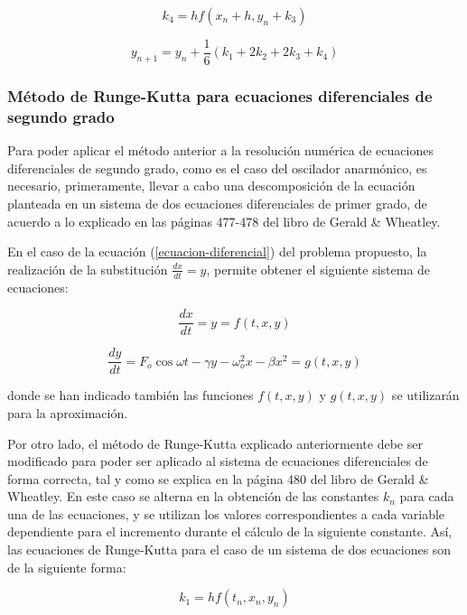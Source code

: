 \documentclass[11pt]{article}
\begin{document}
\begin{equation}
	k_4 = hf(x_n + h, y_n + k_3)
\end{equation} 

\begin{equation}
	y_{n+1} = y_{n} + \frac{1}{6}(k_1 + 2k_2 + 2k_3 + k_4)
\end{equation}

\subsubsection{Método de Runge-Kutta para ecuaciones diferenciales de segundo grado}
\label{segundo_grado}
Para poder aplicar el método anterior a la resolución numérica de ecuaciones diferenciales de segundo grado, como es el caso del oscilador anarmónico, es necesario, primeramente, llevar a cabo una descomposición de la ecuación planteada en un sistema de dos ecuaciones diferenciales
de primer grado, de acuerdo a lo explicado en las páginas 477-478 del libro de Gerald \& Wheatley. 

En el caso de la ecuación (\ref{ecuacion-diferencial}) del problema propuesto, la realización de la substitución $\frac{dx}{dt} = y$, permite obtener el siguiente sistema de ecuaciones:

\begin{equation}
	\frac{dx}{dt} = y = f(t, x, y)
\end{equation}

\begin{equation}
	\frac{dy}{dt} = F_{o}\cos{\omega{}t} -\gamma{}y - \omega_{o}^2x - \beta{}x^2 = g(t, x, y) 	
\end{equation}

donde se han indicado también las funciones $f(t, x, y)$ y $g(t, x, y)$ se utilizarán para la aproximación.  

Por otro lado, el método de Runge-Kutta explicado anteriormente debe ser modificado para poder ser aplicado al sistema de ecuaciones diferenciales de forma correcta, tal y como se explica en la página 480 del libro de Gerald \& Wheatley. En este caso se alterna en la obtención de las constantes $k_n$ para cada una de las ecuaciones, y se utilizan los valores correspondientes a cada variable dependiente
para el incremento durante el cálculo de la siguiente constante. Así, las ecuaciones de Runge-Kutta para el caso de un sistema de dos ecuaciones son de la siguiente forma:

\begin{equation}
	k_1 = hf(t_n, x_n, y_n)
\end{equation}
\end{document}
